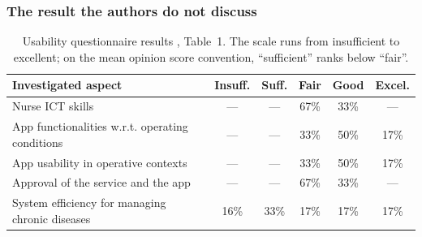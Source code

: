 \documentclass[12pt,a4paper,oneside]{report}
\begin{document}
\subsubsection{The result the authors do not discuss}\label{sec:usability-result}

\begin{table}[htbp]
\centering\footnotesize
\caption{Usability questionnaire results \parencite{mucchi2021}, Table~1. The scale runs from insufficient to excellent; on the mean opinion score convention, ``sufficient'' ranks below ``fair''.}\label{tab:mucchi-usability}
\begin{tabularx}{\textwidth}{@{}X c c c c c@{}}
\toprule
\textbf{Investigated aspect} & \textbf{Insuff.} & \textbf{Suff.} & \textbf{Fair} & \textbf{Good} & \textbf{Excel.} \\
\midrule
Nurse ICT skills & --- & --- & 67\% & 33\% & --- \\
App functionalities w.r.t. operating conditions & --- & --- & 33\% & 50\% & 17\% \\
App usability in operative contexts & --- & --- & 33\% & 50\% & 17\% \\
Approval of the service and the app & --- & --- & 67\% & 33\% & --- \\
System efficiency for managing chronic diseases & 16\% & 33\% & 17\% & 17\% & 17\% \\
\bottomrule
\end{tabularx}
\end{table}
\end{document}

